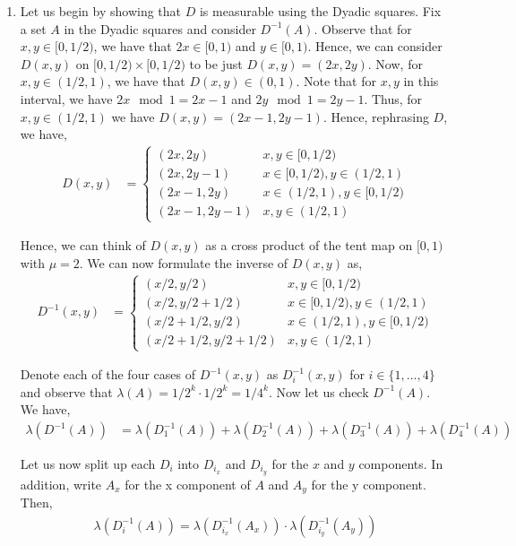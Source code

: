 \documentclass[12pt]{article}
\begin{document}
\begin{enumerate}[label=\alph*)]

\item Let us begin by showing that $D$ is measurable using the Dyadic squares. Fix a set $A$ in the Dyadic squares and consider $D^{-1}(A)$. Observe that for $x, y \in [0, 1/2)$, we have that $2x \in [0, 1)$ and $y \in [0, 1)$. Hence, we can consider $D(x,y)$ on $[0, 1/2) \times [0, 1/2)$ to be just $D(x,y) = (2x, 2y)$. Now, for $x, y \in (1/2, 1)$, we have that $D(x,y) \in (0, 1)$. Note that for $x, y$ in this interval, we have $2x \mod 1 = 2x-1$ and $2y \mod 1 = 2y-1$. Thus, for $x,y \in (1/2, 1)$ we have $D(x, y) = (2x-1, 2y-1)$. Hence, rephrasing $D$, we have,
\begin{align*}
D(x, y) &= \begin{cases}
(2x, 2y) & x, y \in [0, 1/2)\\
(2x, 2y-1) & x \in [0, 1/2), y \in (1/2, 1)\\
(2x-1, 2y) & x \in (1/2, 1), y \in [0, 1/2)\\
(2x-1, 2y-1) & x, y \in (1/2, 1)
\end{cases}
\end{align*}

Hence, we can think of $D(x,y)$ as a cross product of the tent map on $[0, 1)$ with $\mu = 2$. We can now formulate the inverse of $D(x,y)$ as,
\begin{align*}
D^{-1}(x, y) &= \begin{cases}
(x/2, y/2) & x, y \in [0, 1/2)\\
(x/2, y/2 + 1/2) & x \in [0, 1/2), y \in (1/2, 1)\\
(x/2 + 1/2, y/2) & x \in (1/2, 1), y \in [0, 1/2)\\
(x/2 +1/2, y/2 + 1/2) & x, y \in (1/2, 1)
\end{cases}
\end{align*}

Denote each of the four cases of $D^{-1}(x,y)$ as $D_i^{-1}(x,y)$ for $i \in \{1, \ldots, 4\}$ and observe that $\lambda(A) = 1/2^k \cdot 1/2^k = 1/4^k$. Now let us check $D^{-1}(A)$. We have,
\begin{align*}
\lambda(D^{-1}(A)) &= \lambda(D_1^{-1}(A)) + \lambda(D_2^{-1}(A)) + \lambda(D_3^{-1}(A)) + \lambda(D_4^{-1}(A))
\end{align*}

Let us now split up each $D_i$ into $D_{i_x}$ and $D_{i_y}$ for the $x$ and $y$ components. In addition, write $A_x$ for the x component of $A$ and $A_y$ for the y component. Then,
\begin{align*}
\lambda(D_i^{-1}(A)) = \lambda(D_{i_x}^{-1}(A_x)) \cdot \lambda(D_{i_y}^{-1}(A_y))
\end{align*}


\end{enumerate}
\end{document}

